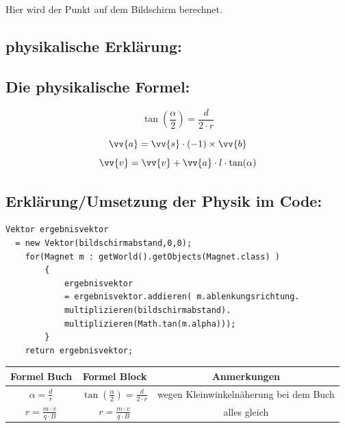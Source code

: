 Hier wird der Punkt auf dem Bildschirm berechnet.
\subsection{physikalische Erklärung:}
\subsection{Die physikalische Formel:}
\begin{equation}
    \label{eq:tan}
    \tan(\frac{\alpha}{2}) = \frac{d}{2 \cdot r}
\end{equation}

\begin{equation}
    \label{eq:a}
    \vv{a} = \vv{s} \cdot (-1) \times \vv{b}
\end{equation}
\begin{equation}
    \label{eq:v}
    \vv{v} = \vv{v} + \vv{a} \cdot l \cdot \tan(\alpha)
\end{equation}

\subsection{Erklärung/Umsetzung der Physik im Code:}
\begin{lstlisting}
Vektor ergebnisvektor 
  = new Vektor(bildschirmabstand,0,0);
    for(Magnet m : getWorld().getObjects(Magnet.class) )
        {
            ergebnisvektor 
            = ergebnisvektor.addieren( m.ablenkungsrichtung.
            multiplizieren(bildschirmabstand).
            multiplizieren(Math.tan(m.alpha)));
        }
    return ergebnisvektor;
\end{lstlisting}

\begin{tabular}{c|c|c}
     Formel Buch & Formel Block & Anmerkungen  \\
     \hline
    $\alpha = \frac{d}{r}$ &$\tan(\frac{\alpha}{2}) = \frac{d}{2\cdot r}$& wegen Kleinwinkelnäherung bei dem Buch \\
    \hline
   $r = \frac{m\cdot v}{q\cdot B}$  & $r = \frac{m\cdot v}{q\cdot B}$& alles gleich 
     
\end{tabular}













 
